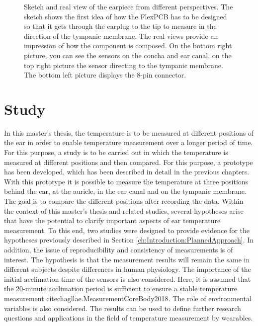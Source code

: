 \begin{figure}[!h]
    \caption{Sketch and real view of the earpiece from different perspectives.
The sketch shows the first idea of how the FlexPCB has to be designed so that it gets through the earplug to the tip to measure in the direction of the tympanic membrane. The real views provide an impression of how the component is composed. On the bottom right picture, you can see the sensors on the concha and ear canal, on the top right picture the sensor directing to the tympanic membrane. The bottom left picture displays the 8-pin connector.}
    \label{fig:design:prototype_earpiece_views}
\end{figure}

\section{Study}
\label{ch:Design:Study}
In this master's thesis, the temperature is to be measured at different positions of the ear in order to enable temperature measurement over a longer period of time. 
For this purpose, a study is to be carried out in which the temperature is measured at different positions and then compared. 
For this purpose, a prototype has been developed, which has been described in detail in the previous chapters. 
With this prototype it is possible to measure the temperature at three positions behind the ear, at the auricle, in the ear canal and on the tympanic membrane.
The goal is to compare the different positions after recording the data. 
Within the context of this master's thesis and related studies, several hypotheses arise that have the potential to clarify important aspects of ear temperature measurement.
To this end, two studies were designed to provide evidence for the hypotheses previously described in Section \ref{ch:Introduction:PlannedApproach}.
In addition, the issue of reproducibility and consistency of measurements is of interest. 
The hypothesis is that the measurement results will remain the same in different subjects despite differences in human physiology. 
The importance of the initial acclimation time of the sensors is also considered. 
Here, it is assumed that the 20-minute acclimation period is sufficient to ensure a stable temperature measurement {cite{chagllae.MeasurementCoreBody2018}}. 
The role of environmental variables is also considered. 
The results can be used to define further research questions and applications in the field of temperature measurement by wearables.

